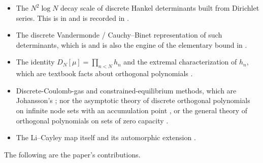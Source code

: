 \documentclass[11pt]{amsart}
\numberwithin{equation}{section}
\theoremstyle{plain}
\theoremstyle{definition}
\theoremstyle{remark}
\begin{document}
\begin{itemize}
\item The $N^{2}\log N$ decay scale of discrete Hankel determinants built from Dirichlet series.
This is in \cite{Monien2009} and is recorded in \cite{HaynesZudilin2015}.
\item The discrete Vandermonde / Cauchy--Binet representation of such determinants, which is
\cite{Monien2009} and is also the engine of the elementary bound in \cite{HaynesZudilin2015}.
\item The identity $D_{N}[\mu]=\prod_{n<N}h_{n}$ and the extremal characterization of $h_{n}$, which
are textbook facts about orthogonal polynomials \cite{Chihara1978}.
\item Discrete-Coulomb-gas and constrained-equilibrium methods, which are Johansson's
\cite{Johansson2001}; nor the asymptotic theory of discrete orthogonal polynomials on infinite node
sets with an accumulation point \cite{WuLinXuZhao2016}, or the general theory of orthogonal
polynomials on sets of zero capacity \cite{StahlTotik1992,Totik2005Orthogonal}.
\item The Li--Cayley map itself \cite{Li1997,BombieriLagarias1999} and its automorphic extension
\cite{Lagarias2007}.
\end{itemize}

The following are the paper's contributions.
\end{document}
